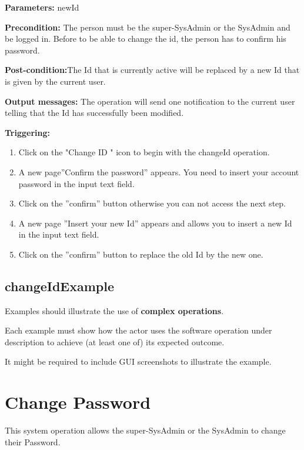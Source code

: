 \begin{description}

\item \textbf{Parameters:} newId
\item \textbf{Precondition:} The person must be the super-SysAdmin or the
SysAdmin and be logged in. Before to be able to change the id, the person has to
confirm his password.
\item \textbf{Post-condition:}The Id that is currently active will be
replaced by a new Id that is given by the current user.
\item \textbf{Output messages:} The operation will send one notification to the
current user telling that the Id  has successfully been modified.


\item \textbf{Triggering:}
\begin{enumerate}
\item Click on the "Change ID " icon to begin with the changeId operation. 
\item A new page''Confirm the password'' appears. You need to insert your
account password in the input text field. 
\item Click on the ''confirm'' button otherwise you can not access the next
step.
\item A new page ''Insert your new Id'' appears and allows you to
insert a new Id in the input text field.
\item Click on the ''confirm'' button to replace the old Id by the new one.

\end{enumerate}

 
\end{description}

 
\subsection{changeIdExample}
Examples should illustrate the use of \textbf{complex operations}.

Each example must show how the actor uses the software operation under
description to achieve (at least one of) its expected outcome.

It might be required to include GUI screenshots to illustrate the example.



\section{Change Password}
\label{operation:NewPw}
This system operation allows the super-SysAdmin or the SysAdmin to change
their Password.

